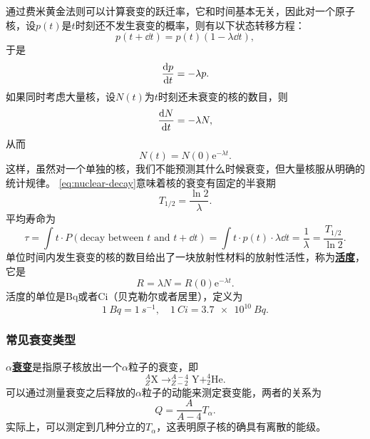 \documentclass[UTF8, a4paper]{ctexart}
\newcommand*{\ee}{\mathrm{e}}
\newcommand*{\nuclear}[3]{^{#2}_{#3}\text{#1}}
\newcommand*{\concept}[1]{\underline{\textbf{#1}}}
\begin{document}
通过费米黄金法则可以计算衰变的跃迁率，它和时间基本无关，因此对一个原子核，设$p(t)$是$t$时刻还不发生衰变的概率，则有以下状态转移方程：
\[
    p(t+\dd{t}) = p(t) (1 - \lambda \dd{t}),
\]
于是
\[
    \dv{p}{t} = - \lambda p.
\]
如果同时考虑大量核，设$N(t)$为$t$时刻还未衰变的核的数目，则
\[
    \dv{N}{t} = - \lambda N,
\]
从而
\begin{equation}
    N(t) = N(0) \ee^{- \lambda t}.
    \label{eq:nuclear-decay}
\end{equation}
这样，虽然对一个单独的核，我们不能预测其什么时候衰变，但大量核服从明确的统计规律。
\eqref{eq:nuclear-decay}意味着核的衰变有固定的半衰期
\begin{equation}
    T_{1/2} = \frac{\ln 2}{\lambda}.    
\end{equation}
平均寿命为
\begin{equation}
    \tau = \int t \cdot P(\text{decay between $t$ and $t+\dd{t}$}) = \int t \cdot p(t) \cdot \lambda \dd{t} = \frac{1}{\lambda} = \frac{T_{1/2}}{\ln 2}.
\end{equation}
单位时间内发生衰变的核的数目给出了一块放射性材料的放射性活性，称为\concept{活度}，它是
\begin{equation}
    R = \lambda N = R(0) \ee^{-\lambda t}.
\end{equation}
活度的单位是\si{Bq}或者\si{Ci}（贝克勒尔或者居里），定义为
\[
    \SI{1}{Bq} = \SI{1}{s^{-1}}, \quad \SI{1}{Ci} = \SI{3.7e10}{Bq}.
\]

\subsubsection{常见衰变类型}

\concept{$\alpha$衰变}是指原子核放出一个$\alpha$粒子的衰变，即
\[
    \nuclear{X}{A}{Z} \longrightarrow \nuclear{Y}{A-4}{Z-2} + \nuclear{He}{4}{2}.
\]
可以通过测量衰变之后释放的$\alpha$粒子的动能来测定衰变能，两者的关系为
\begin{equation}
    Q = \frac{A}{A-4} T_\alpha.
\end{equation}
实际上，可以测定到几种分立的$T_\alpha$，这表明原子核的确具有离散的能级。
\end{document}
